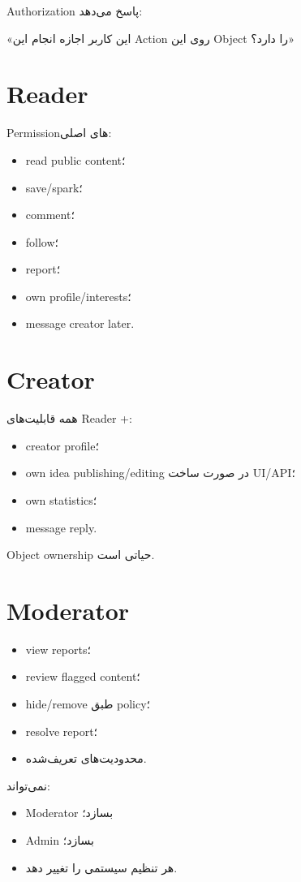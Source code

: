 Authorization پاسخ می‌دهد:
\begin{center}
«این کاربر اجازه انجام این Action روی این Object را دارد؟»
\end{center}

\section{Reader}

Permissionهای اصلی:
\begin{itemize}
  \item read public content؛
  \item save/spark؛
  \item comment؛
  \item follow؛
  \item report؛
  \item own profile/interests؛
  \item message creator later.
\end{itemize}

\section{Creator}

همه قابلیت‌های Reader +:
\begin{itemize}
  \item creator profile؛
  \item own idea publishing/editing در صورت ساخت UI/API؛
  \item own statistics؛
  \item message reply.
\end{itemize}

Object ownership حیاتی است.

\section{Moderator}

\begin{itemize}
  \item view reports؛
  \item review flagged content؛
  \item hide/remove طبق policy؛
  \item resolve report؛
  \item محدودیت‌های تعریف‌شده.
\end{itemize}

نمی‌تواند:
\begin{itemize}
  \item Moderator بسازد؛
  \item Admin بسازد؛
  \item هر تنظیم سیستمی را تغییر دهد.
\end{itemize}


